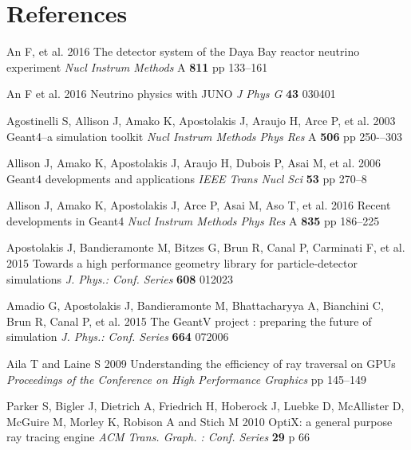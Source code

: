 \documentclass[a4paper]{jpconf}
\begin{document}





\section*{References}
\begin{thebibliography}{9}


An F, et al.
2016
The detector system of the Daya Bay reactor neutrino experiment
{\it Nucl Instrum Methods} A {\bf 811} pp 133--161

An F et al.  
2016
Neutrino physics with JUNO
{\it J Phys G} {\bf 43} 030401


Agostinelli S, Allison J, Amako K, Apostolakis J, Araujo H, Arce P, et al. 
2003  
Geant4--a simulation toolkit 
{\it Nucl Instrum Methods Phys Res} A {\bf 506} pp 250-–303 

Allison J, Amako K, Apostolakis J, Araujo H, Dubois P, Asai M, et al. 
2006 
Geant4 developments and applications 
{\it IEEE Trans Nucl Sci} {\bf 53} pp 270--8

Allison J, Amako K, Apostolakis J, Arce P, Asai M, Aso T, et al. 
2016 
Recent developments in Geant4 
{\it Nucl Instrum Methods Phys Res} A {\bf 835} pp 186--225


Apostolakis J, Bandieramonte M, Bitzes G, Brun R, Canal P, Carminati F, et al. 
2015
Towards a high performance geometry library for particle-detector simulations
{\it J. Phys.: Conf. Series} {\bf 608} 012023

Amadio G, Apostolakis J, Bandieramonte M, Bhattacharyya A, Bianchini C, Brun R, Canal P, et al.
2015
The GeantV project : preparing the future of simulation 
{\it J. Phys.: Conf. Series} {\bf 664} 072006


Aila T and Laine S 
2009
Understanding the efficiency of ray traversal on GPUs
{\it Proceedings of the Conference on High Performance Graphics} pp 145--149


Parker S, Bigler J, Dietrich A, Friedrich H, Hoberock J, Luebke D, McAllister D, McGuire M, Morley K, Robison A and Stich M 
2010 
OptiX: a general purpose ray tracing engine
{\it ACM Trans. Graph. : Conf. Series} {\bf 29} p 66 


\end{thebibliography}
\end{document}
